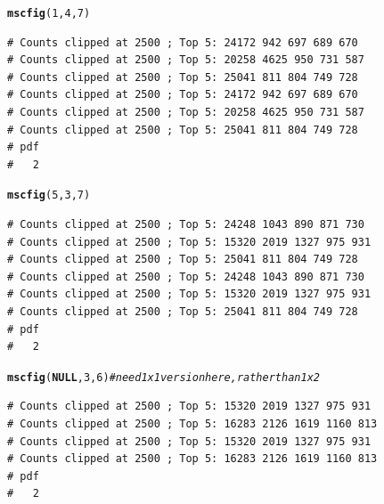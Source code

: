 \documentclass{article}\usepackage[]{graphicx}\usepackage[]{color}
\makeatletter
\newcommand{\hlnum}[1]{\textcolor[rgb]{0.686,0.059,0.569}{#1}}%
\newcommand{\hlcom}[1]{\textcolor[rgb]{0.678,0.584,0.686}{\textit{#1}}}%
\newcommand{\hlstd}[1]{\textcolor[rgb]{0.345,0.345,0.345}{#1}}%
\newcommand{\hlkwa}[1]{\textcolor[rgb]{0.161,0.373,0.58}{\textbf{#1}}}%
\newcommand{\hlkwd}[1]{\textcolor[rgb]{0.737,0.353,0.396}{\textbf{#1}}}%
\newenvironment{kframe}{%
 \def\at@end@of@kframe{}%
 \ifinner\ifhmode%
  \def\at@end@of@kframe{\end{minipage}}%
  \begin{minipage}{\columnwidth}%
 \fi\fi%
 \def\FrameCommand##1{\hskip\@totalleftmargin \hskip-\fboxsep
 \colorbox{shadecolor}{##1}\hskip-\fboxsep
     \hskip-\linewidth \hskip-\@totalleftmargin \hskip\columnwidth}%
 \MakeFramed {\advance\hsize-\width
   \@totalleftmargin\z@ \linewidth\hsize
   \@setminipage}}%
 {\par\unskip\endMakeFramed%
 \at@end@of@kframe}
\newenvironment{knitrout}{}{} %
\makeatother
\begin{document}
\begin{knitrout}\footnotesize
{}\color{fgcolor}\begin{kframe}
\begin{alltt}
\hlkwd{mscfig}\hlstd{(}\hlnum{1}\hlstd{,}\hlnum{4}\hlstd{,}\hlnum{7}\hlstd{)}
\end{alltt}
\begin{verbatim}
# Counts clipped at 2500 ; Top 5: 24172 942 697 689 670
# Counts clipped at 2500 ; Top 5: 20258 4625 950 731 587
# Counts clipped at 2500 ; Top 5: 25041 811 804 749 728
# Counts clipped at 2500 ; Top 5: 24172 942 697 689 670
# Counts clipped at 2500 ; Top 5: 20258 4625 950 731 587
# Counts clipped at 2500 ; Top 5: 25041 811 804 749 728
# pdf 
#   2
\end{verbatim}
\end{kframe}
\end{knitrout}
\begin{knitrout}\footnotesize
{}\color{fgcolor}\begin{kframe}
\begin{alltt}
\hlkwd{mscfig}\hlstd{(}\hlnum{5}\hlstd{,}\hlnum{3}\hlstd{,}\hlnum{7}\hlstd{)}
\end{alltt}
\begin{verbatim}
# Counts clipped at 2500 ; Top 5: 24248 1043 890 871 730
# Counts clipped at 2500 ; Top 5: 15320 2019 1327 975 931
# Counts clipped at 2500 ; Top 5: 25041 811 804 749 728
# Counts clipped at 2500 ; Top 5: 24248 1043 890 871 730
# Counts clipped at 2500 ; Top 5: 15320 2019 1327 975 931
# Counts clipped at 2500 ; Top 5: 25041 811 804 749 728
# pdf 
#   2
\end{verbatim}
\end{kframe}
\end{knitrout}
\begin{knitrout}\footnotesize
{}\color{fgcolor}\begin{kframe}
\begin{alltt}
\hlkwd{mscfig}\hlstd{(}\hlkwa{NULL}\hlstd{,}\hlnum{3}\hlstd{,}\hlnum{6}\hlstd{)} \hlcom{# need 1 x 1 version here, rather than 1 x 2}
\end{alltt}
\begin{verbatim}
# Counts clipped at 2500 ; Top 5: 15320 2019 1327 975 931
# Counts clipped at 2500 ; Top 5: 16283 2126 1619 1160 813
# Counts clipped at 2500 ; Top 5: 15320 2019 1327 975 931
# Counts clipped at 2500 ; Top 5: 16283 2126 1619 1160 813
# pdf 
#   2
\end{verbatim}
\end{kframe}
\end{knitrout}
\end{document}

